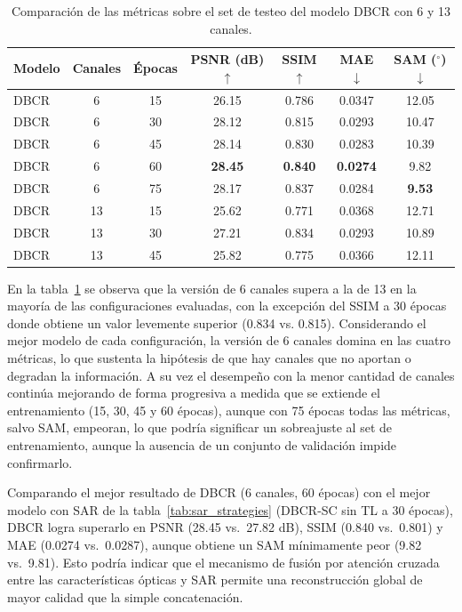 \begin{table}[H]
    \centering
    \begin{tabular}{lcccccc}
        \hline
        \textbf{Modelo} & \textbf{Canales} &\textbf{Épocas} & \textbf{PSNR (dB)$\uparrow$} & \textbf{SSIM$\uparrow$} & \textbf{MAE$\downarrow$} & \textbf{SAM ($^\circ$)$\downarrow$} \\
        \hline
        DBCR & 6  & 15 & 26.15 & 0.786 & 0.0347 & 12.05 \\
        DBCR  & 6    & 30 & 28.12 & 0.815 & 0.0293 & 10.47 \\
        DBCR  & 6    & 45 & 28.14 & 0.830 & 0.0283 & 10.39 \\
        DBCR  & 6    & 60 & \textbf{28.45} & \textbf{0.840} & \textbf{0.0274} & 9.82 \\
        DBCR  & 6    & 75 & 28.17 & 0.837 & 0.0284 & \textbf{9.53} \\
        DBCR  & 13   & 15 & 25.62 & 0.771 & 0.0368 & 12.71 \\
        DBCR & 13 & 30 & 27.21 & 0.834 & 0.0293 & 10.89 \\
        DBCR & 13 & 45 & 25.82 & 0.775 & 0.0366 & 12.11 \\
        \hline
    \end{tabular}
    \caption{Comparación de las métricas sobre el set de testeo del modelo DBCR con 6 y 13 canales.}
    \label{tab:dbcr_bandas}
\end{table}

En la tabla~\ref{tab:dbcr_bandas} se observa que la versión de 6 canales supera a la de 13 en la mayoría de las configuraciones evaluadas, con la excepción del SSIM a 30 épocas donde obtiene un valor levemente superior (0.834 vs. 0.815). Considerando el mejor modelo de cada configuración, la versión de 6 canales domina en las cuatro métricas, lo que sustenta la hipótesis de que hay canales que no aportan o degradan la información. A su vez el desempeño con la menor cantidad de canales continúa mejorando de forma progresiva a medida que se extiende el entrenamiento (15, 30, 45 y 60 épocas), aunque con 75 épocas todas las métricas, salvo SAM, empeoran, lo que podría significar un sobreajuste al set de entrenamiento, aunque la ausencia de un conjunto de validación impide confirmarlo.

Comparando el mejor resultado de DBCR (6 canales, 60 épocas) con el mejor modelo con SAR de la tabla~\ref{tab:sar_strategies} (DBCR-SC sin TL a 30 épocas), DBCR logra superarlo en PSNR (28.45 vs.\ 27.82 dB), SSIM (0.840 vs.\ 0.801) y MAE (0.0274 vs.\ 0.0287), aunque obtiene un SAM mínimamente peor (9.82 vs.\ 9.81). Esto podría indicar que el mecanismo de fusión por atención cruzada entre las características ópticas y SAR permite una reconstrucción global de mayor calidad que la simple concatenación.


